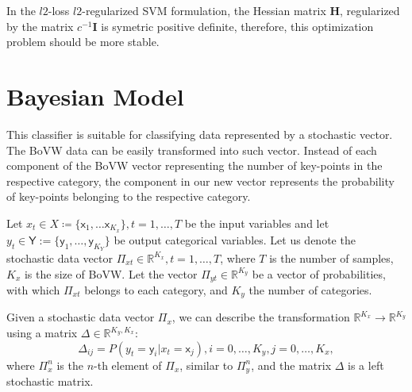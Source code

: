 \documentclass{aip-cp}
\begin{document}
In the $l2$-loss $l2$-regularized SVM formulation, the Hessian matrix $\boldsymbol{H}$, regularized by the matrix $c^{-1}\boldsymbol{I}$ is symetric positive definite, therefore, this optimization problem should be more stable.

\section{Bayesian Model}
This classifier is suitable for classifying data represented by a stochastic vector. The BoVW data can be easily transformed into such vector. Instead of each component of the BoVW vector representing the number of key-points in the respective category, the component in our new vector represents the probability of key-points belonging to the respective category.

Let $x_t \in X \coloneqq \lbrace \mathsf{x}_1, \dots \mathsf{x}_{K_x} \rbrace, t = 1,\dots,T$ be the input variables and let $y_t \in \mathsf{Y} := \lbrace \mathsf{y}_1, \dots, \mathsf{y}_{K_Y} \rbrace$ be output categorical variables.
Let us denote the stochastic data vector $\Pi_{xt} \in \mathbb{R}^{K_x}, t=1,\dots,T$, where $T$ is the number of samples, $K_x$ is the size of BoVW. Let the vector $\Pi_{yt}\in \mathbb{R}^{K_y}$ be a vector of probabilities, with which $\Pi_{xt}$ belongs to each category, and $K_y$ the number of categories.

Given a stochastic data vector $\Pi_x$, we can describe the transformation $\mathbb{R}^{K_x} \rightarrow \mathbb{R}^{K_y}$ using a matrix $\Delta \in \mathbb{R}^{K_y, K_x}$:
\begin{equation}
    \Delta_{ij} = P(y_t = \mathsf{y}_i | x_t = \mathsf{x}_j), i = 0, \dots, K_y, j = 0, \dots, K_x,
\end{equation}
where $\Pi_x^n$ is the $n$-th element of $\Pi_x$, similar to $\Pi_y^n$, and the matrix $\Delta$ is a left stochastic matrix.
\end{document}
